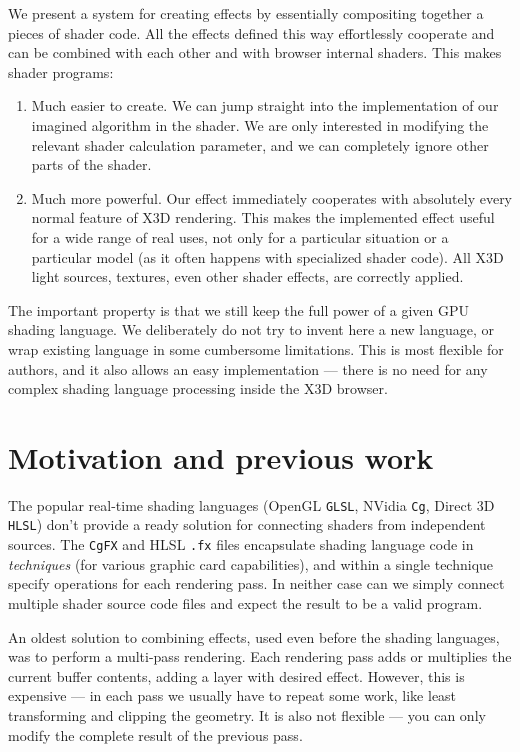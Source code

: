 \documentclass{acmsiggraph}                     %
\begin{document}
We present a system for creating effects by essentially compositing together
a pieces of shader code. All the effects defined this way effortlessly
cooperate and can be combined with each other and with browser internal
shaders. This makes shader programs:

\begin{enumerate}
\item Much easier to create. We can jump straight into the implementation
  of our imagined algorithm in the shader.
  We are only interested in modifying the relevant shader calculation
  parameter, and we can completely ignore other parts of the shader.

\item Much more powerful. Our effect
  immediately cooperates with absolutely every normal feature of X3D rendering.
  This makes the implemented effect useful for a wide range of real uses,
  not only for a particular situation or a particular model (as it often happens
  with specialized shader code).
  All X3D light sources, textures, even other shader effects,
  are correctly applied.
\end{enumerate}

The important property is that we still keep
the full power of a given GPU shading language.
We deliberately do not try to invent here a new language, or wrap existing
language in some cumbersome limitations. This is most flexible for authors,
and it also allows an easy implementation --- there is no need for any complex
shading language processing inside the X3D browser.

\section{Motivation and previous work}

The popular real-time shading languages (OpenGL \texttt{GLSL}, NVidia \texttt{Cg}, Direct 3D \texttt{HLSL})
don't provide a ready solution for connecting shaders from independent sources.
The \texttt{CgFX} and HLSL \texttt{.fx} files encapsulate shading language code
in \emph{techniques} (for various graphic card capabilities),
and within a single technique specify operations for each rendering pass.
In neither case can we simply connect multiple shader source code files
and expect the result to be a valid program.

An oldest solution to combining effects, used even before the shading languages,
was to perform a multi-pass rendering. Each rendering pass adds or multiplies
the current buffer contents, adding a layer with desired effect.
However, this is expensive --- in each pass we usually have to repeat
some work, like least transforming and clipping the geometry.
It is also not flexible --- you can only modify
the complete result of the previous pass.
\end{document}
